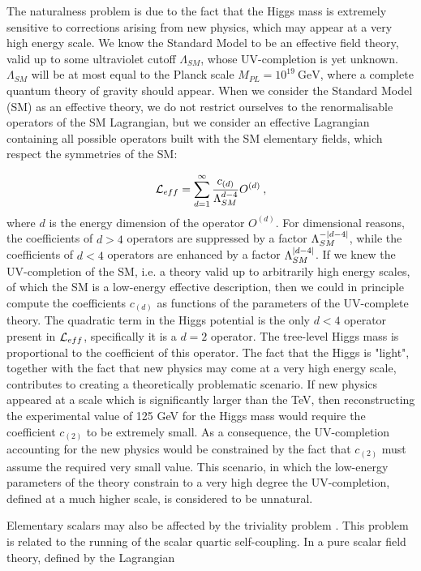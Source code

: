 The naturalness problem is due to the fact that the Higgs mass is extremely sensitive to corrections arising from new physics, which may appear at a very high energy scale. We know the Standard Model to be an effective field theory, valid up to some ultraviolet cutoff $\Lambda_{SM}$, whose UV-completion is yet unknown. $\Lambda_{SM}$ will be at most equal to the Planck scale $M_{PL} = 10^{19} \: \mathrm{GeV}$, where a complete quantum theory of gravity should appear. 
When we consider the Standard Model (SM) as an effective theory, we do not restrict ourselves to the renormalisable operators of the SM Lagrangian, but we consider an effective Lagrangian containing all possible operators built with the SM elementary fields, which respect the symmetries of the SM:

\begin{equation}
\mathcal L_{eff} = \sum_{d=1}^{\infty} \frac{c_{(d)}}{\Lambda_{SM}^{d-4}} O^{(d)} \: ,
\end{equation}
%
where $d$ is the energy dimension of the operator $O^{(d)}$. For dimensional reasons, the coefficients of $d > 4$ operators are suppressed by a factor $\Lambda_{SM}^{- \abs{d-4}}$, while the coefficients of $d < 4$ operators are enhanced by a factor $\Lambda_{SM}^{\abs{d-4}}$. If we knew the UV-completion of the SM, i.e. a theory valid up to arbitrarily high energy scales, of which the SM is a low-energy effective description, then we could in principle compute the coefficients $c_{(d)}$ as functions of the parameters of the UV-complete theory.
 The quadratic term in the Higgs potential is the only $d<4$ operator present in $\mathcal L_{eff}$, specifically it is a $d=2$ operator. The tree-level Higgs mass is proportional to the coefficient of this operator. The fact that the Higgs is "light", together with the fact that new physics may come at a very high energy scale, contributes to creating a theoretically problematic scenario. If new physics appeared at a scale which is significantly larger than the TeV, then reconstructing the experimental value of 125 GeV for the Higgs mass would require the coefficient $c_{(2)}$ to be extremely small. As a consequence, the UV-completion accounting for the new physics would be constrained by the fact that $c_{(2)}$ must assume the required very small value. This scenario, in which the low-energy parameters of the theory constrain to a very high degree the UV-completion, defined at a much higher scale, is considered to be unnatural.
 
Elementary scalars may also be affected by the triviality problem \cite{Callaway:1988ya}. This problem is related to the running of the scalar quartic self-coupling. In a pure scalar field theory, defined by the Lagrangian
 

